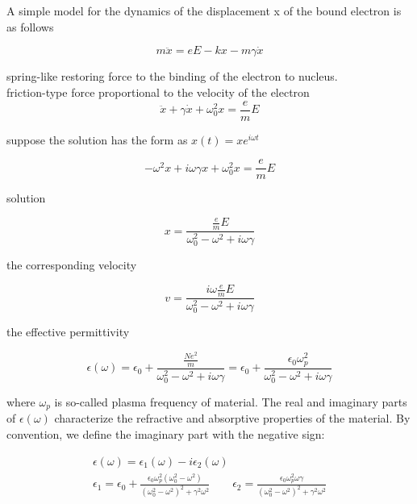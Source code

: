 \documentclass{article}
\begin{document}
		A simple model for the dynamics of the displacement x of the bound electron is as follows

		\begin{equation}
			m\ddot{x} = eE - kx - m\gamma\dot{x}
		\end{equation}

		spring-like restoring force to the binding of the electron to nucleus.\\
		friction-type force proportional to the velocity of the electron\\

		\begin{equation}
			\ddot{x} + \gamma\dot{x} + \omega_{0}^{2}x = \frac{e}{m}E
		\end{equation}

		suppose the solution has the form as $x(t) = xe^{i\omega t}$

		\begin{equation}
			-\omega^{2}x + i\omega\gamma x + \omega_{0}^{2}x = \frac{e}{m}E
		\end{equation}

		solution

		\begin{equation}
			x = \frac{\frac{e}{m}E}{\omega_{0}^{2} - \omega^{2} + i\omega\gamma}
		\end{equation}

		the corresponding velocity

		\begin{equation}
			v = \frac{i\omega\frac{e}{m}E}{\omega_{0}^{2} - \omega^{2} + i\omega\gamma}
		\end{equation}

		the effective permittivity

		\begin{equation}
			\epsilon(\omega) = \epsilon_{0} + \frac{\frac{Ne^{2}}{m}}{\omega_{0}^{2} - \omega^{2} + i\omega\gamma} = \epsilon_{0} + \frac{\epsilon_{0}\omega_{p}^{2}}{\omega_{0}^{2} - \omega^{2} + i\omega\gamma}
		\end{equation}

		where $\omega_{p}$ is so-called plasma frequency of material. The real and imaginary parts of $\epsilon(\omega)$ characterize the refractive and absorptive properties of the material. By convention, we define the imaginary part with the negative sign:

		\begin{equation}
		\begin{aligned}
			\epsilon(\omega) = \epsilon_{1}(\omega) - i\epsilon_{2}(\omega)\\
			\epsilon_{1} = \epsilon_{0} + \frac{\epsilon_{0}\omega_{p}^{2}(\omega_{0}^{2} - \omega^{2})}{(\omega_{0}^{2} - \omega^{2})^{2} + \gamma^{2}\omega^{2}} \ \ \ \ \ \ \ \ \ \epsilon_{2} = \frac{\epsilon_{0}\omega_{p}^{2}\omega\gamma}{(\omega_{0}^{2} - \omega^{2})^{2} + \gamma^{2}\omega^{2}}
		\end{aligned}
		\end{equation}
\end{document}

